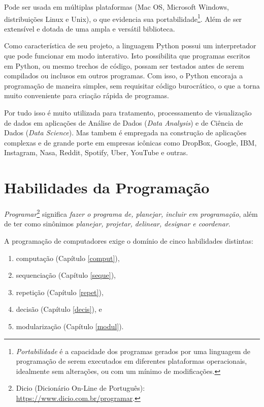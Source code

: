 \documentclass[
]{book}
\providecommand{\tightlist}{%
  \setlength{\itemsep}{0pt}\setlength{\parskip}{0pt}}
\begin{document}
Pode ser usada em múltiplas plataformas (Mac OS, Microsoft Windows, distribuições Linux e Unix), o que evidencia sua portabilidade\footnote{\emph{Portabilidade} é a capacidade dos programas gerados por uma linguagem de programação de serem executados em diferentes plataformas operacionais, idealmente sem alterações, ou com um mínimo de modificações.}. Além de ser extensível e dotada de uma ampla e versátil biblioteca.

Como característica de seu projeto, a linguagem Python possui um interpretador que pode funcionar em modo interativo. Isto possibilita que programas escritos em Python, ou mesmo trechos de código, possam ser testados antes de serem compilados ou inclusos em outros programas. Com isso, o Python encoraja a programação de maneira simples, sem requisitar código burocrático, o que a torna muito conveniente para criação rápida de programas.

Por tudo isso é muito utilizada para tratamento, processamento de visualização de dados em aplicações de Análise de Dados (\emph{Data Analysis}) e de Ciência de Dados (\emph{Data Science}). Mas tambem é empregada na construção de aplicações complexas e de grande porte em empresas icônicas como DropBox, Google, IBM, Instagram, Nasa, Reddit, Spotify, Uber, YouTube e outras.

\hypertarget{introd-habil}{%
\section{Habilidades da Programação}\label{introd-habil}}

\emph{Programar}\footnote{Dicio (Dicionário On-Line de Português): \url{https://www.dicio.com.br/programar}.} significa \emph{fazer o programa de, planejar, incluir em programação}, além de ter como sinônimos \emph{planejar, projetar, delinear, designar e coordenar}.

A programação de computadores exige o domínio de cinco habilidades distintas:

\begin{enumerate}
\def\labelenumi{\arabic{enumi}.}
\tightlist
\item
  computação (Capítulo \ref{comput}),
\item
  sequenciação (Capítulo \ref{seque}),
\item
  repetição (Capítulo \ref{repet}),
\item
  decisão (Capítulo \ref{decis}), e
\item
  modularização (Capítulo \ref{modul}).
\end{enumerate}
\end{document}
